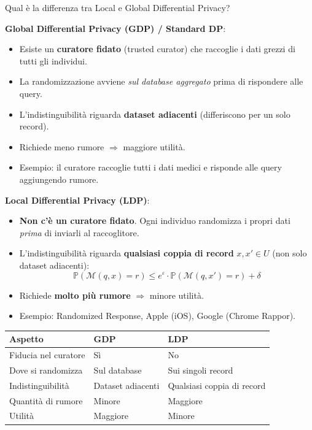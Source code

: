 \documentclass[a4paper,11pt]{article}
\begin{document}
\begin{domanda}
Qual \`{e} la differenza tra Local e Global Differential Privacy?
\end{domanda}

\textbf{Global Differential Privacy (GDP) / Standard DP}:
\begin{itemize}
  \item Esiste un \textbf{curatore fidato} (trusted curator) che raccoglie i dati grezzi di tutti gli individui.
  \item La randomizzazione avviene \emph{sul database aggregato} prima di rispondere alle query.
  \item L'indistinguibilit\`{a} riguarda \textbf{dataset adiacenti} (differiscono per un solo record).
  \item Richiede meno rumore $\Rightarrow$ maggiore utilit\`{a}.
  \item Esempio: il curatore raccoglie tutti i dati medici e risponde alle query aggiungendo rumore.
\end{itemize}

\textbf{Local Differential Privacy (LDP)}:
\begin{itemize}
  \item \textbf{Non c'\`{e} un curatore fidato}. Ogni individuo randomizza i propri dati \emph{prima} di inviarli al raccoglitore.
  \item L'indistinguibilit\`{a} riguarda \textbf{qualsiasi coppia di record} $x, x' \in U$ (non solo dataset adiacenti):
  \[
  \mathbb{P}(\mathcal{M}(q, x) = r) \leq e^{\varepsilon} \cdot \mathbb{P}(\mathcal{M}(q, x') = r) + \delta
  \]
  \item Richiede \textbf{molto pi\`{u} rumore} $\Rightarrow$ minore utilit\`{a}.
  \item Esempio: Randomized Response, Apple (iOS), Google (Chrome Rappor).
\end{itemize}

\begin{center}
\begin{tabular}{lll}
\toprule
\textbf{Aspetto} & \textbf{GDP} & \textbf{LDP} \\
\midrule
Fiducia nel curatore & S\`{i} & No \\
Dove si randomizza & Sul database & Sui singoli record \\
Indistinguibilit\`{a} & Dataset adiacenti & Qualsiasi coppia di record \\
Quantit\`{a} di rumore & Minore & Maggiore \\
Utilit\`{a} & Maggiore & Minore \\
\bottomrule
\end{tabular}
\end{center}
\end{document}

